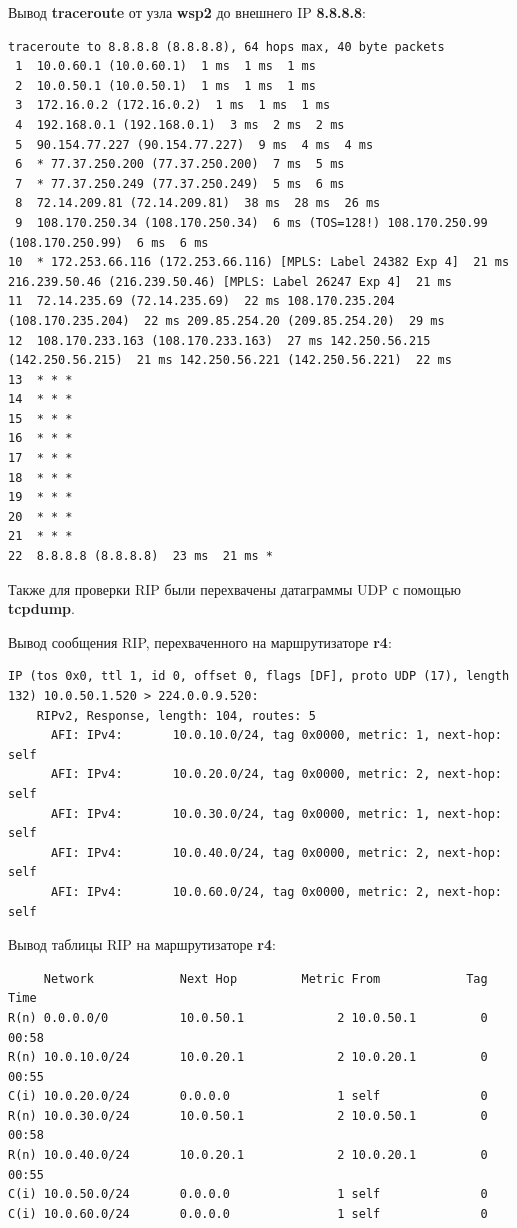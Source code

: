 \documentclass[a4paper,12pt]{article}
\begin{document}
Вывод \textbf{traceroute} от узла \textbf{wsp2} до внешнего IP \textbf{8.8.8.8}:

\begin{Verbatim}
traceroute to 8.8.8.8 (8.8.8.8), 64 hops max, 40 byte packets
 1  10.0.60.1 (10.0.60.1)  1 ms  1 ms  1 ms
 2  10.0.50.1 (10.0.50.1)  1 ms  1 ms  1 ms
 3  172.16.0.2 (172.16.0.2)  1 ms  1 ms  1 ms
 4  192.168.0.1 (192.168.0.1)  3 ms  2 ms  2 ms
 5  90.154.77.227 (90.154.77.227)  9 ms  4 ms  4 ms
 6  * 77.37.250.200 (77.37.250.200)  7 ms  5 ms
 7  * 77.37.250.249 (77.37.250.249)  5 ms  6 ms
 8  72.14.209.81 (72.14.209.81)  38 ms  28 ms  26 ms
 9  108.170.250.34 (108.170.250.34)  6 ms (TOS=128!) 108.170.250.99 (108.170.250.99)  6 ms  6 ms
10  * 172.253.66.116 (172.253.66.116) [MPLS: Label 24382 Exp 4]  21 ms 216.239.50.46 (216.239.50.46) [MPLS: Label 26247 Exp 4]  21 ms
11  72.14.235.69 (72.14.235.69)  22 ms 108.170.235.204 (108.170.235.204)  22 ms 209.85.254.20 (209.85.254.20)  29 ms
12  108.170.233.163 (108.170.233.163)  27 ms 142.250.56.215 (142.250.56.215)  21 ms 142.250.56.221 (142.250.56.221)  22 ms
13  * * *
14  * * *
15  * * *
16  * * *
17  * * *
18  * * *
19  * * *
20  * * *
21  * * *
22  8.8.8.8 (8.8.8.8)  23 ms  21 ms *
\end{Verbatim}

Также для проверки RIP были перехвачены датаграммы UDP с помощью \textbf{tcpdump}.

Вывод сообщения RIP, перехваченного на маршрутизаторе \textbf{r4}:

\begin{Verbatim}
IP (tos 0x0, ttl 1, id 0, offset 0, flags [DF], proto UDP (17), length 132) 10.0.50.1.520 > 224.0.0.9.520: 
	RIPv2, Response, length: 104, routes: 5
	  AFI: IPv4:       10.0.10.0/24, tag 0x0000, metric: 1, next-hop: self
	  AFI: IPv4:       10.0.20.0/24, tag 0x0000, metric: 2, next-hop: self
	  AFI: IPv4:       10.0.30.0/24, tag 0x0000, metric: 1, next-hop: self
	  AFI: IPv4:       10.0.40.0/24, tag 0x0000, metric: 2, next-hop: self
	  AFI: IPv4:       10.0.60.0/24, tag 0x0000, metric: 2, next-hop: self
\end{Verbatim}

Вывод таблицы RIP на маршрутизаторе \textbf{r4}:

\begin{Verbatim}
     Network            Next Hop         Metric From            Tag Time
R(n) 0.0.0.0/0          10.0.50.1             2 10.0.50.1         0 00:58
R(n) 10.0.10.0/24       10.0.20.1             2 10.0.20.1         0 00:55
C(i) 10.0.20.0/24       0.0.0.0               1 self              0
R(n) 10.0.30.0/24       10.0.50.1             2 10.0.50.1         0 00:58
R(n) 10.0.40.0/24       10.0.20.1             2 10.0.20.1         0 00:55
C(i) 10.0.50.0/24       0.0.0.0               1 self              0
C(i) 10.0.60.0/24       0.0.0.0               1 self              0
\end{Verbatim}
\end{document}
